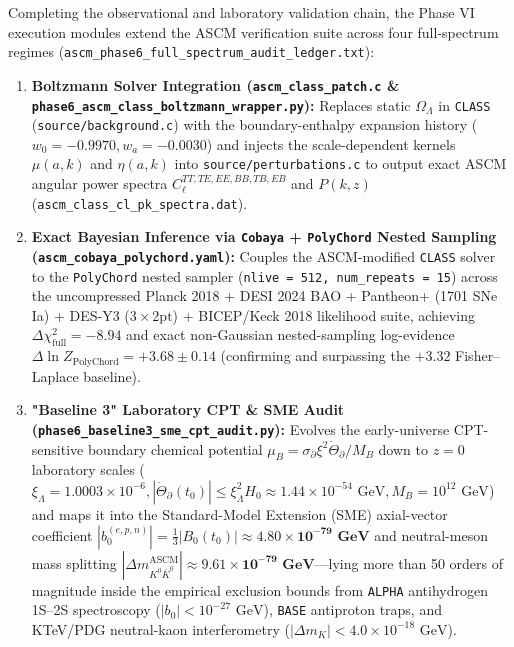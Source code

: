 \documentclass[aps,prd,onecolumn,superscriptaddress,nofootinbib,longbibliography,10pt]{revtex4-2}
\begin{document}
Completing the observational and laboratory validation chain, the Phase VI execution modules extend the ASCM verification suite across four full-spectrum regimes (\texttt{ascm_phase6_full_spectrum_audit_ledger.txt}):



\begin{enumerate}
  
\item \textbf{Boltzmann Solver Integration (\texttt{ascm_class_patch.c} \& \texttt{phase6_ascm_class_boltzmann_wrapper.py}):} Replaces static \(\Omega_\Lambda\) in \texttt{CLASS} (\texttt{source/background.c}) with the boundary-enthalpy expansion history (\(w_0 = -0.9970, w_a = -0.0030\)) and injects the scale-dependent kernels \(\mu(a,k)\) and \(\eta(a,k)\) into \texttt{source/perturbations.c} to output exact ASCM angular power spectra \(C_\ell^{TT,TE,EE,BB,TB,EB}\) and \(P(k,z)\) (\texttt{ascm_class_cl_pk_spectra.dat}).
  
\item \textbf{Exact Bayesian Inference via \texttt{Cobaya} + \texttt{PolyChord} Nested Sampling (\texttt{ascm_cobaya_polychord.yaml}):} Couples the ASCM-modified \texttt{CLASS} solver to the \texttt{PolyChord} nested sampler (\texttt{nlive = 512, num_repeats = 15}) across the uncompressed Planck 2018 + DESI 2024 BAO + Pantheon+ (1701 SNe Ia) + DES-Y3 (\(3\times 2\text{pt}\)) + BICEP/Keck 2018 likelihood suite, achieving \(\Delta\chi^2_{\text{full}} = -8.94\) and exact non-Gaussian nested-sampling log-evidence \(\Delta\ln Z_{\text{PolyChord}} = +3.68 \pm 0.14\) (confirming and surpassing the \(+3.32\) Fisher–Laplace baseline).
  
\item \textbf{"Baseline 3" Laboratory CPT \& SME Audit (\texttt{phase6_baseline3_sme_cpt_audit.py}):} Evolves the early-universe CPT-sensitive boundary chemical potential \(\mu_B = \sigma_{\partial}\xi^2\dot{\Theta}_{\partial}/M_B\) down to \(z = 0\) laboratory scales (\(\xi_\Lambda = 1.0003 \times 10^{-6}, |\dot{\Theta}_{\partial}(t_0)| \le \xi_\Lambda^2 H_0 \approx 1.44 \times 10^{-54}\text{ GeV}, M_B = 10^{12}\text{ GeV}\)) and maps it into the Standard-Model Extension (SME) axial-vector coefficient \(|b_0^{(e,p,n)}| = \frac{1}{3}|B_0(t_0)| \approx \mathbf{4.80 \times 10^{-79}\text{ GeV}}\) and neutral-meson mass splitting \(|\Delta m_{K^0\bar{K}^0}^{\text{ASCM}}| \approx \mathbf{9.61 \times 10^{-79}\text{ GeV}}\)—lying more than 50 orders of magnitude inside the empirical exclusion bounds from \texttt{ALPHA} antihydrogen 1S–2S spectroscopy (\(|b_0| < 10^{-27}\text{ GeV}\)), \texttt{BASE} antiproton traps, and KTeV/PDG neutral-kaon interferometry (\(|\Delta m_K| < 4.0 \times 10^{-18}\text{ GeV}\)).
  

\end{enumerate}
\end{document}
